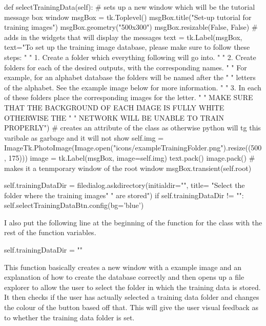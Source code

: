 \documentclass{report}
\begin{document}
\begin{python}
def selectTrainingData(self):
    # sets up a new window which will be the tutorial message box window
    msgBox = tk.Toplevel()
    msgBox.title("Set-up tutorial for training images")
    msgBox.geometry("500x300")
    msgBox.resizable(False, False)
    # adds in the widgets that will display the messages
    text = tk.Label(msgBox, text="To set up the training image database, please make sure to follow these steps: \n"
                    "  1. Create a folder which everything following will go into. \n"
                    "  2. Create folders for each of the desired outputs, with the corresponding names. \n"
                    "     For example, for an alphabet database the folders will be named after the \n"
                    "     letters of the alphabet. See the example image below for more information. \n"
                    "  3. In each of these folders place the corresponding images for the letter. \n"
                    "     MAKE SURE THAT THE BACKGROUND OF EACH IMAGE IS FULLY WHITE OTHERWISE THE \n"
                    "     NETWORK WILL BE UNABLE TO TRAIN PROPERLY")
    # creates an attribute of the class as otherwise python will tg this varibale as garbage and it will not show
    self.img = ImageTk.PhotoImage(Image.open("icons/exampleTrainingFolder.png").resize((500, 175)))
    image = tk.Label(msgBox, image=self.img)
    text.pack()
    image.pack()
    # makes it a tenmporary window of the root window
    msgBox.transient(self.root)

    self.trainingDataDir = filedialog.askdirectory(initialdir="", title=
                            "Select the folder where the training images"
                            " are stored")
    if self.trainingDataDir != "":
        self.selectTrainingDataBtn.config(bg='blue')
\end{python}
I also put the following line at the beginning of the  function for the class with the rest of the function variables.
\begin{python}
self.trainingDataDir = ""
\end{python}
This function basically creates a new window with a example image and an explanation of how to create the database correctly and then opens up a file explorer to allow the user to select the folder in which the training data is stored. It then checks if the user has actually selected a training data folder and changes the colour of the button based off that. This will give the user visual feedback as to whether the training data folder is set.
\end{document}
